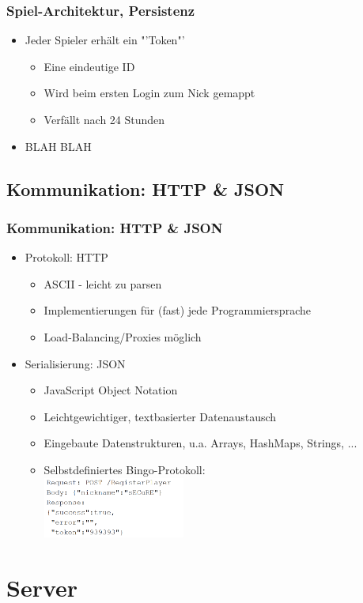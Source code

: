\documentclass{beamer}
\begin{document}
\begin{frame}[fragile]
\frametitle{Spiel-Architektur, Persistenz}
\begin{itemize}
\item Jeder Spieler erhält ein "'Token"'
\begin{itemize}
\item Eine eindeutige ID
\item Wird beim ersten Login zum Nick gemappt
\item Verfällt nach 24 Stunden
\end{itemize}
\item BLAH BLAH
\end{itemize}
\end{frame}


\subsection{Kommunikation: HTTP \& JSON}
\begin{frame}[fragile]
\frametitle{Kommunikation: HTTP \& JSON}
\begin{itemize}
\item Protokoll: HTTP
\begin{itemize}
\item ASCII - leicht zu parsen
\item Implementierungen für (fast) jede Programmiersprache
\item Load-Balancing/Proxies möglich
\end{itemize}
\item Serialisierung: JSON
\begin{itemize}
\item JavaScript Object Notation
\item Leichtgewichtiger, textbasierter Datenaustausch
\item Eingebaute Datenstrukturen, u.a. Arrays, HashMaps, Strings, ...
\item Selbstdefiniertes Bingo-Protokoll: \\
\includegraphics[height=2cm]{protocol.png}
\end{itemize}
\end{itemize}
\end{frame}

\section{Server}
\end{document}
